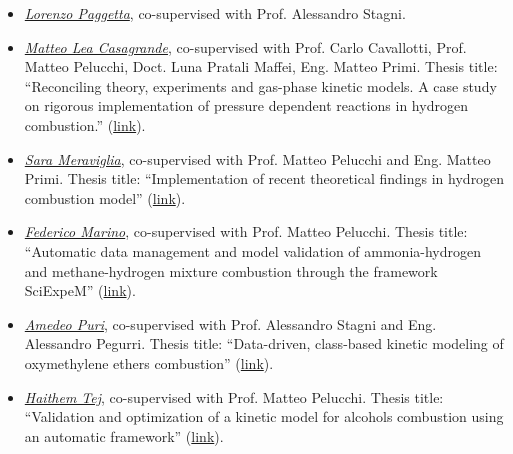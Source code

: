 
\begin{itemize}
   \item [ ] \ul{\it Lorenzo Paggetta}, co-supervised with Prof. Alessandro Stagni.

   \item [ ] \ul{\it Matteo Lea Casagrande}, co-supervised with Prof. Carlo Cavallotti,
      Prof. Matteo Pelucchi, Doct. Luna Pratali Maffei, Eng. Matteo Primi. Thesis title:
      ``Reconciling theory, experiments and gas-phase kinetic models. A case study on
      rigorous implementation of pressure dependent reactions in hydrogen combustion.''
      (\href{https://hdl.handle.net/10589/226533}{link}).

   \item [ ] \ul{\it Sara Meraviglia}, co-supervised with Prof. Matteo Pelucchi and Eng.
      Matteo Primi. Thesis title: ``Implementation of recent theoretical findings in
      hydrogen combustion model'' (\href{https://hdl.handle.net/10589/214934}{link}).

   \item [ ] \ul{\it Federico Marino}, co-supervised with Prof. Matteo Pelucchi. Thesis
      title: ``Automatic data management and model validation of ammonia-hydrogen and
      methane-hydrogen mixture combustion through the framework SciExpeM''
      (\href{https://hdl.handle.net/10589/212616}{link}).

   \item [ ] \ul{\it Amedeo Puri}, co-supervised with Prof. Alessandro Stagni and Eng.
      Alessandro Pegurri. Thesis title: ``Data-driven, class-based kinetic modeling of
      oxymethylene ethers combustion'' (\href{https://hdl.handle.net/10589/206686}{link}).

   \item [ ] \ul{\it Haithem Tej}, co-supervised with Prof. Matteo Pelucchi. Thesis title:
      ``Validation and optimization of a kinetic model for alcohols combustion using an
      automatic framework'' (\href{https://hdl.handle.net/10589/210401}{link}).

\end{itemize}

